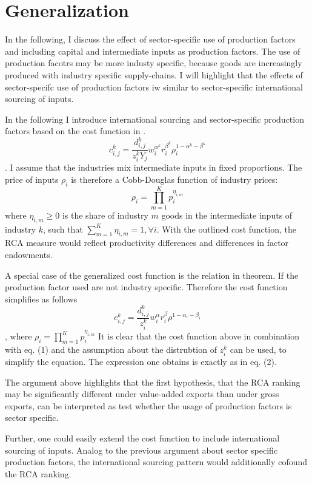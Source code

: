\section{Generalization}
In the following, I discuss the effect of sector-specific use of production factors and  including capital and intermediate inputs as production factors. The use of production facotrs may be more industy specific, because  goods are increasingly produced with  industry specific supply-chains.  
 I will highlight that the effects of sector-specifc use of production factors iw similar to sector-specific international sourcing of inputs.  \par
In the following I introduce international sourcing and sector-specific production factors based on the cost function in \textcite{Shikher}.
  \[ c^k_{i,j}=\frac{d^k_{i,j}}{z_{i}^k Y_j} w^{\alpha^k}_i r^{\beta^k}_i \rho^{1-\alpha^k-\beta^k}_{i} \].
 I assume that the industries mix intermediate inputs in fixed proportions.
  The price of inputs $\rho_i$ is therefore a Cobb-Douglas function of industry prices:
\[\rho_{i}= \prod\limits_{m=1}^{K}  p^{\eta_{i,m}}_{i}  \] where $\eta_{i,m} \geq 0$ is the share of industry $m$ goods in the intermediate inputs of industry $k$, such that $\sum_{m=1}^K \eta_{i,m}=1, \forall i$.   
With the outlined cost function, the RCA measure would reflect productivity differences and differences in factor endowments.
\par A special case of the generalized cost function is the relation in theorem.
If the production factor used are not industry specific.
Therefore the cost function simplifies as follows  \[ c^k_{i,j}=\frac{d^k_{i,j}}{z_{i}^k } w^{\alpha}_i r^{\beta}_i \rho^{1-\alpha_{i}-\beta_{i}} \], where
$\rho_{i}= \prod\limits_{m=1}^{K}  p^{\eta_{i,m}}_{i} $
 It is clear that the cost function above in combination with eq. (1) and the assumption about the distrubtion of $z_{i}^k$  can be used, to simplify the equation. 
 The expression one obtains is exactly as in eq. (2). \par
The argument above highlights that the first hypothesis, that the RCA ranking may be significantly different under value-added exports than under gross exports, can be interpreted as test whether the usage of production factors is sector specific. \par 
Further, one could easily extend the cost function to include international sourcing of inputs.
 Analog to the previous argument about sector specific production factors, the international sourcing pattern would additionally cofound the RCA ranking.
